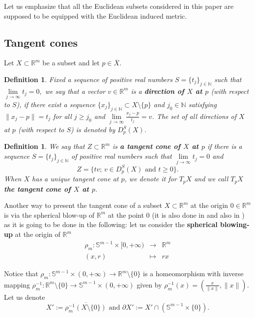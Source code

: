 \documentclass{amsart}
\newtheorem{definition}[theorem]{Definition}
\newcommand{\R}{\mathbb{R}}
\newcommand{\N}{\mathbb{N}}
\begin{document}
Let us emphasize that all the Euclidean subsets considered in this paper are supposed to be equipped with the Euclidean induced metric.

\subsection{Tangent cones}

Let $X\subset \R^m$ be a subset and let $p\in \overline{X}$.
\begin{definition}
Fixed a sequence of positive real numbers $S=\{t_j\}_{j\in \N}$ such that $\lim\limits_{j\to \infty} t_j=0,$ we say that a vector $v\in \R^m$ is a {\bf direction of $X$ at $p$} (with respect to $S$), if there exist a sequence $\{x_j\}_{j\in \N} \subset X\setminus \{p\}$ and $j_0\in \N$ satisfying $\|x_j-p\|=t_j$ for all $j\geq j_0$ and $\lim\limits_{j\to \infty}\frac{x_j-p}{t_j}=v$. The set of all directions of $X$ at $p$ (with respect to $S$) is denoted by $D_p^{S}(X)$. 
\end{definition}
\begin{definition}
We say that $Z\subset \R^{m}$ is {\bf a tangent cone of $X$ at $p$} if there is a sequence $S=\{t_j\}_{j\in \N}$ of positive real numbers such that $\lim\limits_{j\to \infty} t_j=0$ and 
$$
Z=\{tv;\, v\in D_p^S(X)\mbox{ and }t\geq 0\}.
$$
When $X$ has a unique tangent cone at $p$, we denote it for $T_{p}X$ and we call $T_{p}X$ {\bf the tangent cone of $X$ at $p$}.
\end{definition}



Another way to present the tangent cone of a subset $X\subset\R^m$ at the origin $0\in\R^m$ is via the spherical blow-up of $\R^m$ at the point $0$ (it is also done in \cite{BirbrairFG:2017} and also in \cite{Sampaio:2017}) as it is going to be done in the following: let us consider the {\bf spherical blowing-up} at the origin of $\R^m$
$$
\begin{array}{ccl}
\rho_m\colon\mathbb{S}^{m-1}\times [0,+\infty )&\longrightarrow & \R^m\\
(x,r)&\longmapsto &rx
\end{array}
$$

Notice that $\rho_m\colon\mathbb{S}^{m-1}\times (0,+\infty )\to \R^m\setminus \{0\}$ is a homeomorphism with inverse mapping $\rho_m^{-1}\colon\R^m\setminus \{0\}\to \mathbb{S}^{m-1}\times (0,+\infty )$ given by $\rho_m^{-1}(x)=(\frac{x}{\|x\|},\|x\|)$. Let us denote
$$X':=\overline{\rho_m^{-1}(X\setminus \{0\})} \mbox{ and } \partial X':=X'\cap (\mathbb{S}^{m-1}\times \{0\}).$$
\end{document}

